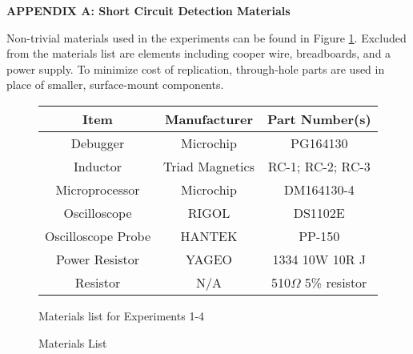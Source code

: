 \centerline{\large\bf APPENDIX A: Short Circuit Detection Materials}\label{appendix:scd-materials}
Non-trivial materials used in the experiments can be found in Figure \ref{fig:Materials}. Excluded from the materials list are elements including cooper wire, breadboards, and a power supply. To minimize cost of replication, through-hole parts are used in place of smaller, surface-mount components.
\begin{figure}[!htbp]
    \centering	
    \bgroup
    \def\arraystretch{1.25}%
    \begin{tabular}{| c | c | c |}
        \hline			
        Item & Manufacturer & Part Number(s)\\ \hline \hline \cline{1-3}
        Debugger & Microchip & PG164130\\ \hline
        Inductor & Triad Magnetics & RC-1; RC-2; RC-3\\ \hline
        Microprocessor & Microchip & DM164130-4\\ \hline
        Oscilloscope & RIGOL & DS1102E\\ \hline
        Oscilloscope Probe & HANTEK & PP-150\\  \hline  
        Power Resistor & YAGEO & 1334 10W 10R J\\  \hline  
        Resistor & N/A & 510$\Omega$ 5\% resistor\\  \hline  
    \end{tabular}
    \egroup
    \caption{Materials List}Materials list for Experiments 1-4
    \label{fig:Materials}
\end{figure}